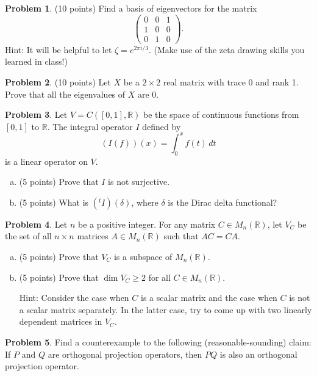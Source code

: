 \documentclass[11pt,oneside]{amsart}
\theoremstyle{definition}
\newtheorem{problem}{Problem}
\newcommand{\bR}{\mathbb{R}}
\begin{document}
    \vfill
    \newpage
    \begin{problem}
        (10 points) Find a basis of eigenvectors for the matrix
        \[\begin{pmatrix}0&0&1\\1&0&0\\0&1&0\end{pmatrix}.\]
        Hint: It will be helpful to let $\zeta=e^{2\pi i/3}$. (Make use of the zeta drawing skills you learned in class!)
    \end{problem}
    \vfill
    \newpage
    \begin{problem}
        (10 points) Let $X$ be a $2\times 2$ real matrix with trace 0 and rank 1. Prove that all the eigenvalues of $X$ are 0.
    \end{problem}
    \vfill
    \newpage
    \begin{problem}
        Let $V=C([0,1],\bR)$ be the space of continuous functions from $[0,1]$ to $\bR$. The integral operator $I$ defined by
        \[(I(f))(x)=\int_0^x f(t)\,dt\]
        is a linear operator on $V$.
        \begin{enumerate}[(a)]
            \item (5 points) Prove that $I$ is not surjective.
            \vfill
            \item (5 points) What is $(^tI)(\delta)$, where $\delta$ is the Dirac delta functional?
            \vfill
        \end{enumerate}
    \end{problem}
    \newpage
    \begin{problem}
        Let $n$ be a positive integer. For any matrix $C\in M_n(\bR)$, let $V_C$ be the set of all $n\times n$ matrices $A\in M_n(\bR)$ such that $AC=CA$.
        \begin{enumerate}[(a)]
            \item (5 points) Prove that $V_C$ is a subspace of $M_n(\bR)$.
            \vfill
            \item (5 points) Prove that $\dim V_C\geq 2$ for all $C\in M_n(\bR)$.

            Hint: Consider the case when $C$ is a scalar matrix and the case when $C$ is not a scalar matrix separately. In the latter case, try to come up with two linearly dependent matrices in $V_C$.
            \vfill
        \end{enumerate}
    \end{problem}
    \newpage
    \begin{problem}
        Find a counterexample to the following (reasonable-sounding) claim: If $P$ and $Q$ are orthogonal projection operators, then $PQ$ is also an orthogonal projection operator.
    \end{problem}
    \newpage
\end{document}
